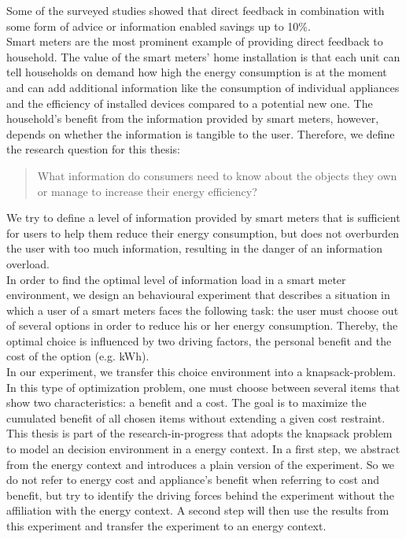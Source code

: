 Some of the surveyed studies showed that direct feedback in combination with some form of advice or information enabled savings up to 10\%.\\
Smart meters are the most prominent example of providing direct feedback to household. The value of the smart meters' home installation is that each unit can tell households on demand how high the energy consumption is at the moment and can add additional information like the consumption of individual appliances and the efficiency of installed devices compared to a potential new one. The household's benefit from the information provided by smart meters, however, depends on whether the information is tangible to the user.
Therefore, we define the research question for this thesis:
\begin{quotation}
What information do consumers need to know about the objects they own or manage to increase their energy efficiency? 
\end{quotation}
We try to define a level of information provided by smart meters that is sufficient for users to help them reduce their energy consumption, but does not overburden the user with too much information, resulting in the danger of an information overload.\\
In order to find the optimal level of information load in a smart meter environment, we design an behavioural experiment that describes a situation in which a user of a smart meters faces the following task: the user must choose out of several options in order to reduce his or her energy consumption. Thereby, the optimal choice is influenced by two driving factors, the personal benefit and the cost of the option (e.g. kWh).\\
In our experiment, we transfer this choice environment into a knapsack-problem. In this type of optimization problem, one must choose between several items that show two characteristics: a benefit and a cost. The goal is to maximize the cumulated benefit of all chosen items without extending a given cost restraint.\\ 
This thesis is part of the research-in-progress that adopts the knapsack problem to model an decision environment in a energy context. In a first step, we abstract from the energy context and introduces a plain version of the experiment. So we do not refer to energy cost and appliance's benefit when referring to cost and benefit, but try to identify the driving forces behind the experiment without the affiliation with the energy context. A second step will then use the results from this experiment and transfer the experiment to an energy context.\\ 
